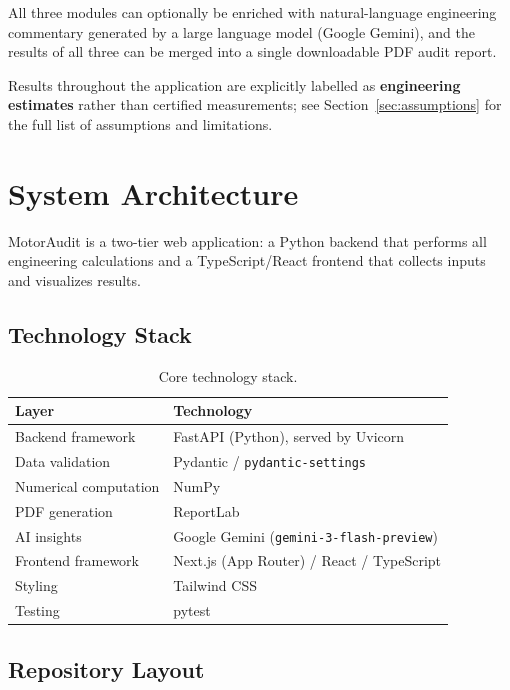 \documentclass[11pt,a4paper]{article}
\begin{document}
All three modules can optionally be enriched with natural-language
engineering commentary generated by a large language model (Google Gemini),
and the results of all three can be merged into a single downloadable PDF
audit report.

Results throughout the application are explicitly labelled as
\textbf{engineering estimates} rather than certified measurements; see
Section~\ref{sec:assumptions} for the full list of assumptions and
limitations.

\section{System Architecture}

MotorAudit is a two-tier web application: a Python backend that performs all
engineering calculations and a TypeScript/React frontend that collects inputs
and visualizes results.

\subsection{Technology Stack}

\begin{table}[h]
\centering
\begin{tabular}{@{}ll@{}}
\toprule
\textbf{Layer} & \textbf{Technology} \\
\midrule
Backend framework      & FastAPI (Python), served by Uvicorn \\
Data validation         & Pydantic / \texttt{pydantic-settings} \\
Numerical computation   & NumPy \\
PDF generation          & ReportLab \\
AI insights             & Google Gemini (\texttt{gemini-3-flash-preview}) \\
Frontend framework      & Next.js (App Router) / React / TypeScript \\
Styling                 & Tailwind CSS \\
Testing                 & pytest \\
\bottomrule
\end{tabular}
\caption{Core technology stack.}
\end{table}

\subsection{Repository Layout}
\end{document}
